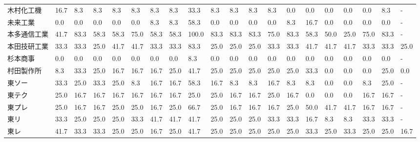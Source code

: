 \begin{tabular}{llllllllllllllllllll}
木村化工機           &   16.7 &    8.3 &       8.3 &       8.3 &        8.3 &    8.3 &    8.3 &   33.3 &     8.3 &     8.3 &    8.3 &   8.3 &    0.0 &     0.0 &     0.0 &   0.0 &   0.0 &   8.3 &     - \\
未来工業            &    0.0 &    0.0 &       0.0 &       0.0 &        0.0 &    8.3 &    8.3 &   58.3 &     0.0 &     0.0 &    0.0 &   0.0 &    8.3 &    16.7 &     0.0 &   0.0 &   0.0 &   0.0 &     - \\
本多通信工業          &   41.7 &   83.3 &      58.3 &      58.3 &       75.0 &   58.3 &   58.3 &  100.0 &    83.3 &    83.3 &   83.3 &  75.0 &   83.3 &    58.3 &    50.0 &  25.0 &  75.0 &  83.3 &     - \\
本田技研工業          &   33.3 &   33.3 &      25.0 &      41.7 &       41.7 &   33.3 &   33.3 &   83.3 &    25.0 &    25.0 &   25.0 &  33.3 &   33.3 &    41.7 &    41.7 &  41.7 &  33.3 &  33.3 &  25.0 \\
杉本商事            &    0.0 &    0.0 &       0.0 &       0.0 &        0.0 &    0.0 &    0.0 &    8.3 &     0.0 &     0.0 &    0.0 &   0.0 &    0.0 &     0.0 &     0.0 &   0.0 &   0.0 &   0.0 &     - \\
村田製作所           &    8.3 &   33.3 &      25.0 &      16.7 &       16.7 &   16.7 &   25.0 &   41.7 &    25.0 &    25.0 &   25.0 &  25.0 &   25.0 &    33.3 &     0.0 &   0.0 &   0.0 &  25.0 &   0.0 \\
東ソー             &   33.3 &   25.0 &      33.3 &      25.0 &        8.3 &   16.7 &   16.7 &   58.3 &    16.7 &     8.3 &    8.3 &  16.7 &    8.3 &     8.3 &     0.0 &   0.0 &   8.3 &  25.0 &     - \\
東テク             &   25.0 &   16.7 &      16.7 &      16.7 &       16.7 &   16.7 &   16.7 &   25.0 &    25.0 &    16.7 &   16.7 &  25.0 &   16.7 &     0.0 &     0.0 &   0.0 &  16.7 &  16.7 &     - \\
東プレ             &   25.0 &   16.7 &      16.7 &      25.0 &       25.0 &   16.7 &   25.0 &   66.7 &    25.0 &    16.7 &   16.7 &  16.7 &   25.0 &    50.0 &    41.7 &  41.7 &  16.7 &  16.7 &     - \\
東リ              &   33.3 &   25.0 &      25.0 &      25.0 &       33.3 &   41.7 &   41.7 &   41.7 &    25.0 &    25.0 &   25.0 &  33.3 &   33.3 &    16.7 &     8.3 &   8.3 &  33.3 &  33.3 &     - \\
東レ              &   41.7 &   33.3 &      33.3 &      25.0 &       25.0 &   16.7 &   25.0 &   41.7 &    25.0 &    25.0 &   25.0 &  25.0 &   25.0 &    33.3 &    25.0 &  33.3 &  25.0 &  25.0 &  16.7 \\

\end{tabular}
